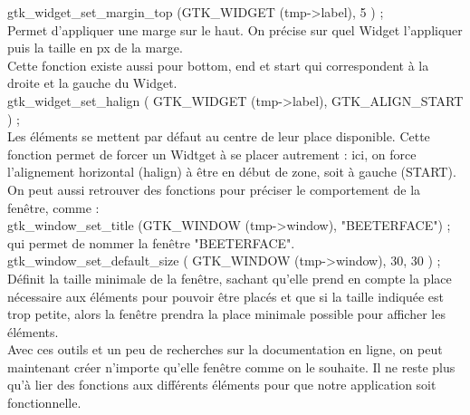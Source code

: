 \documentclass[11pt,french,a4paper]{report}
\begin{document}
 gtk\_widget\_set\_margin\_top (GTK\_WIDGET (tmp->label), 5 ) ; \\
Permet d'appliquer une marge sur le haut. On précise sur quel Widget l'appliquer puis la taille en px de la marge.\\
Cette fonction existe aussi pour bottom, end et start qui correspondent à la droite et la gauche du Widget.\\

 gtk\_widget\_set\_halign ( GTK\_WIDGET (tmp->label), GTK\_ALIGN\_START ) ;\\
Les éléments se mettent par défaut au centre de leur place disponible. Cette fonction permet 
de forcer un Widtget à se placer autrement : ici, on force l'alignement horizontal (halign) à être en début de zone, 
soit à gauche (START). \\

On peut aussi retrouver des fonctions pour préciser le comportement de la fenêtre, comme : \\
 gtk\_window\_set\_title (GTK\_WINDOW (tmp->window), "BEETERFACE") ; \\
qui permet de nommer la fenêtre "BEETERFACE". \\

 gtk\_window\_set\_default\_size ( GTK\_WINDOW (tmp->window), 30, 30 ) ; \\
Définit la taille minimale de la fenêtre, sachant qu'elle prend en compte la place nécessaire aux éléments pour pouvoir 
être placés et que si la taille indiquée est trop petite, alors la fenêtre prendra la place minimale possible 
pour afficher les éléments. \\

Avec ces outils et un peu de recherches sur la documentation en ligne, on peut maintenant créer n'importe qu'elle fenêtre 
comme on le souhaite. Il ne reste plus qu'à lier des fonctions aux différents éléments pour que notre application soit 
fonctionnelle.\\
        
\end{document}
